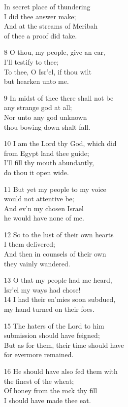 In secret place of thundering\\
I did thee answer make;\\
And at the streams of Meribah\\
of thee a proof did take.

8 O thou, my people, give an ear,\\
I’ll testify to thee;\\
To thee, O Isr’el, if thou wilt\\
but hearken unto me.

9 In midst of thee there shall not be\\
any strange god at all;\\
Nor unto any god unknown\\
thou bowing down shalt fall.

10 I am the Lord thy God, which did\\
from Egypt land thee guide;\\
I’ll fill thy mouth abundantly,\\
do thou it open wide.

11 But yet my people to my voice\\
would not attentive be;\\
And ev’n my chosen Israel\\
he would have none of me.

12 So to the lust of their own hearts\\
I them delivered;\\
And then in counsels of their own\\
they vainly wandered.

13 O that my people had me heard,\\
Isr’el my ways had chose!\\
14 I had their en’mies soon subdued,\\
my hand turned on their foes.

15 The haters of the Lord to him\\
submission should have feigned;\\
But as for them, their time should have\\
for evermore remained.

16 He should have also fed them with\\
the finest of the wheat;\\
Of honey from the rock thy fill\\
I should have made thee eat.

\begin{center}
\quad{}\quad{}
\end{center}

